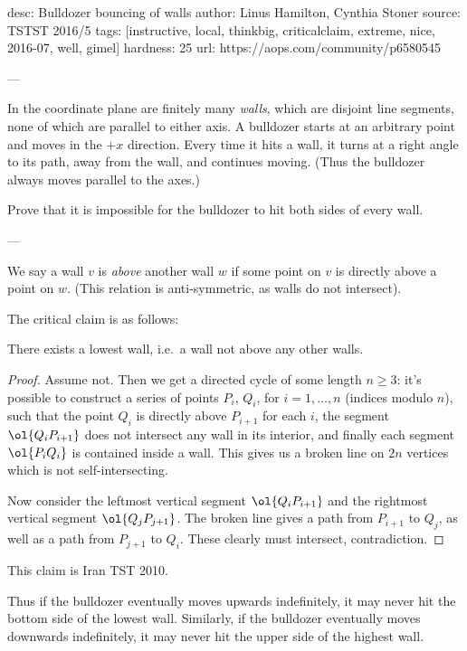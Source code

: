 desc:  Bulldozer bouncing of walls
author: Linus Hamilton, Cynthia Stoner
source:  TSTST 2016/5
tags:  [instructive, local, thinkbig, criticalclaim, extreme, nice, 2016-07, well, gimel]
hardness: 25
url: https://aops.com/community/p6580545

---

In the coordinate plane are finitely many \emph{walls},
which are disjoint line segments, none of which are parallel to either axis.
A bulldozer starts at an arbitrary point and moves in the $+x$ direction.
Every time it hits a wall, it turns at a right angle to its path,
away from the wall, and continues moving.
(Thus the bulldozer always moves parallel to the axes.)

Prove that it is impossible for the bulldozer
to hit both sides of every wall.

---

We say a wall $v$ is \emph{above} another wall $w$ if some point on
$v$ is directly above a point on $w$.
(This relation is anti-symmetric, as walls do not intersect).

The critical claim is as follows:
\begin{claim*}
  There exists a lowest wall,
  i.e.\ a wall not above any other walls.
\end{claim*}
\begin{proof}
  Assume not.
  Then we get a directed cycle of some length $n \ge 3$:
  it's possible to construct a series of points $P_i$, $Q_i$,
  for $i = 1, \dots, n$ (indices modulo $n$), such that
  the point $Q_i$ is directly above $P_{i+1}$ for each $i$,
  the segment $\ol{Q_i P_{i+1}}$ does not intersect any wall in its interior,
  and finally each segment $\ol{P_i Q_i}$ is contained inside a wall.
  This gives us a broken line on $2n$ vertices which is not self-intersecting.

  Now consider the leftmost vertical segment $\ol{Q_i P_{i+1}}$
  and the rightmost vertical segment $\ol{Q_j P_{j+1}}$.
  The broken line gives a path from $P_{i+1}$ to $Q_j$,
  as well as a path from $P_{j+1}$ to $Q_i$.
  These clearly must intersect, contradiction.
\end{proof}
\begin{remark*}
  This claim is Iran TST 2010.
\end{remark*}

Thus if the bulldozer eventually moves upwards indefinitely,
it may never hit the bottom side of the lowest wall.
Similarly, if the bulldozer eventually moves downwards indefinitely,
it may never hit the upper side of the highest wall.
